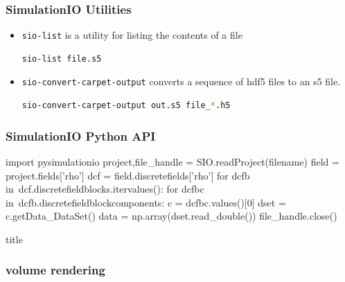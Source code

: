 \documentclass[]{beamer}
\newcommand{\transitionslide}[1]{
  \begin{frame}[plain]
  \vfill
  \centering
  \begin{beamercolorbox}[sep=8pt,center,shadow=true,rounded=true]{title}
    \usebeamerfont{title}{#1}
  \end{beamercolorbox}
  \vfill
\end{frame}
}
\begin{document}
\begin{frame}[fragile]
  \frametitle{SimulationIO Utilities}
  \begin{itemize}
  \item {\color{blue}\lstinline$sio-list$} is a utility for listing the contents of
    a file
\begin{lstlisting}[language=bash]
  sio-list file.s5
\end{lstlisting}
  \item {\color{blue}\lstinline$sio-convert-carpet-output$} converts a
    sequence of hdf5 files to an s5 file.
\begin{lstlisting}[language=bash]
  sio-convert-carpet-output out.s5 file_*.h5
\end{lstlisting}
  \end{itemize}
\end{frame}

\begin{frame}[fragile]
  \frametitle{SimulationIO Python API}
  \begin{python}
    import pysimulationio
    project,file_handle = SIO.readProject(filename)
    field = project.fields['rho']
    dcf = field.discretefields['rho']
    for dcfb in\
    dcf.discretefieldblocks.itervalues():
        for dcfbc in\
        dcfb.discretefieldblockcomponents:
            c = dcfbc.values()[0]
            dset = c.getData_DataSet()
            data = np.array(dset.read_double())
    file_handle.close()
  \end{python}
\end{frame}

\transitionslide{\Huge yt}

\begin{frame}
  \frametitle{volume rendering}
  \begin{center}
  \end{center}
\end{frame}
\end{document}
